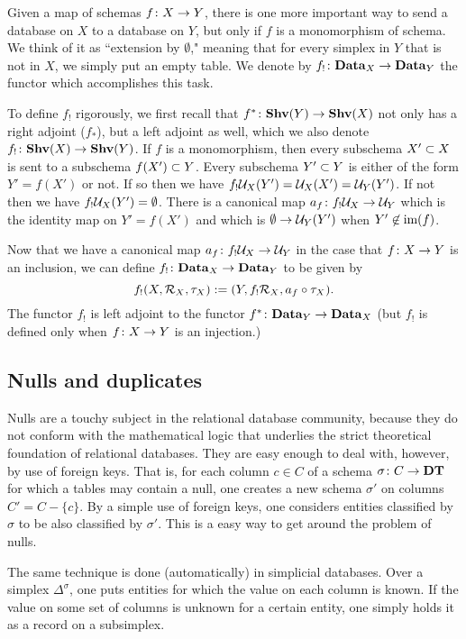 \documentclass{amsart}
\def\DT{{\bf DT}}
\def\Data{{\bf Data}}
\def\im{\tn{im}}
\begin{document}
Given a map of schemas $f\taking X\to Y$, there is one more important way to send a database on $X$ to a database on $Y$, but only if $f$ is a monomorphism of schema.  We think of it as ``extension by $\emptyset$," meaning that for every simplex in $Y$ that is not in $X$, we simply put an empty table.  We denote by $f_!\taking\Data_X\to\Data_Y$ the functor which accomplishes this task. 

To define $f_!$ rigorously, we first recall that $f^*\taking\Shv(Y)\to\Shv(X)$ not only has a right adjoint ($f_*$), but a left adjoint as well, which we also denote $f_!\taking\Shv(X)\to\Shv(Y)$.  If $f$ is a monomorphism, then every subschema $X'\ss X$ is sent to a subschema $f(X')\ss Y$.  Every subschema $Y'\ss Y$ is either of the form $Y'=f(X')$ or not.  If so then we have $f_!\mcU_X(Y')=\mcU_X(X')=\mcU_Y(Y')$.  If not then we have $f_!\mcU_X(Y')=\emptyset$.  There is a canonical map $a_f\taking f_!\mcU_X\to\mcU_Y$ which is the identity map on $Y'=f(X')$ and which is $\emptyset\to\mcU_Y(Y')$ when $Y'\not\in\im(f)$.

Now that we have a canonical map $a_f\taking f_!\mcU_X\to\mcU_Y$ in the case that $f\taking X\to Y$ is an inclusion, we can define $f_!\taking\Data_X\to\Data_Y$ to be given by $$f_!(X,\mcR_X,\tau_X):=(Y,f_!\mcR_X,a_f\circ\tau_X).$$  The functor $f_!$ is left adjoint to the functor $f^*\taking\Data_Y\to\Data_X$ (but $f_!$ is defined only when $f\taking X\to Y$ is an injection.)

\subsection{Nulls and duplicates}\label{subsec:nulls and duplicates}

Nulls are a touchy subject in the relational database community, because they do not conform with the mathematical logic that underlies the strict theoretical foundation of relational databases.  They are easy enough to deal with, however, by use of foreign keys.  That is, for each column $c\in C$ of a schema $\sigma\taking C\to\DT$ for which a tables may contain a null, one creates a new schema $\sigma'$ on columns $C'=C-\{c\}$.  By a simple use of foreign keys, one considers entities classified by $\sigma$ to be also classified by $\sigma'$.  This is a easy way to get around the problem of nulls.

The same technique is done (automatically) in simplicial databases.  Over a simplex $\Delta^\sigma$, one puts entities for which the value on each column is known.  If the value on some set of columns is unknown for a certain entity, one simply holds it as a record on a subsimplex.  
\end{document}
